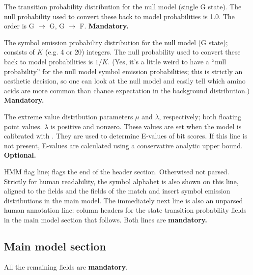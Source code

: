 \begin{wideitem}
\item [\emprog{NULT  <d> <d>}] The transition probability distribution
for the null model (single G state). The null probability used to
convert these back to model probabilities is 1.0. The order is G
$\rightarrow$ G, G $\rightarrow$ F.
\textbf{Mandatory.}

\item [\emprog{NULE  <d>*K}] The symbol emission probability
distribution for the null model (G state); consists of $K$ (e.g. 4 or
20) integers. The null probability used to convert these back to model
probabilities is $1/K$. (Yes, it's a little weird to have a ``null
probability'' for the null model symbol emission probabilities; this
is strictly an aesthetic decision, so one can look at the null model
and easily tell which amino acids are more common than chance
expectation in the background distribution.) 
\textbf{Mandatory.}

\item [\emprog{EVD   <f> <f>}] The extreme value distribution
parameters $\mu$ and $\lambda$, respectively; both floating point
values. $\lambda$ is positive and nonzero. These values are set when
the model is calibrated with . They are used to
determine E-values of bit scores. If this line is not present,
E-values are calculated using a conservative analytic upper bound.
\textbf{Optional.}

\item [\emprog{HMM    }] HMM flag line; flags the end of the header
section. Otherwised not parsed. Strictly for human readability, the
symbol alphabet is also shown on this line, aligned to the 
fields and the fields of the match and insert symbol emission
distributions in the main model. The immediately next line is also an
unparsed human annotation line: column headers for the state
transition probability fields in the main model section that follows.
Both lines are \textbf{mandatory.}

\end{wideitem}

\subsection{Main model section}

All the remaining fields are \textbf{mandatory}.

